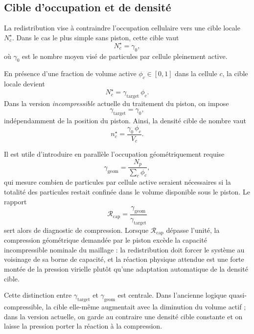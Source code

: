 \documentclass[11pt,a4paper]{article}
\begin{document}
\subsection{Cible d'occupation et de densité}

La redistribution vise à contraindre l'occupation cellulaire vers une cible locale $N_c^{\star}$. Dans le cas le plus simple sans piston, cette cible vaut
\begin{equation}
 N_c^{\star} = \gamma_0,
\end{equation}
où $\gamma_0$ est le nombre moyen visé de particules par cellule pleinement active.

En présence d'une fraction de volume active $\phi_c\in[0,1]$ dans la cellule $c$, la cible locale devient
\begin{equation}
 N_c^{\star} = \gamma_{\mathrm{target}}\,\phi_c.
\end{equation}
Dans la version \emph{incompressible} actuelle du traitement du piston, on impose
\begin{equation}
 \gamma_{\mathrm{target}} = \gamma_0,
\end{equation}
indépendamment de la position du piston. Ainsi, la densité cible de nombre vaut
\begin{equation}
 n_c^{\star} = \frac{\gamma_0\,\phi_c}{V_c}.
\end{equation}

Il est utile d'introduire en parallèle l'occupation géométriquement requise
\begin{equation}
 \gamma_{\mathrm{geom}} = \frac{N_p}{\sum_c \phi_c},
\end{equation}
qui mesure combien de particules par cellule active seraient nécessaires si la totalité des particules restait confinée dans le volume disponible sous le piston. Le rapport
\begin{equation}
 \mathcal{R}_{\mathrm{cap}} = \frac{\gamma_{\mathrm{geom}}}{\gamma_{\mathrm{target}}}
\end{equation}
sert alors de diagnostic de compression. Lorsque \(\mathcal{R}_{\mathrm{cap}}\) dépasse l'unité, la compression géométrique demandée par le piston excède la capacité incompressible nominale du maillage : la redistribution doit forcer le système au voisinage de sa borne de capacité, et la réaction physique attendue est une forte montée de la pression virielle plutôt qu'une adaptation automatique de la densité cible.

Cette distinction entre \(\gamma_{\mathrm{target}}\) et \(\gamma_{\mathrm{geom}}\) est centrale. Dans l'ancienne logique quasi-compressible, la cible elle-même augmentait avec la diminution du volume actif ; dans la version actuelle, on garde au contraire une densité cible constante et on laisse la pression porter la réaction à la compression.
\end{document}
